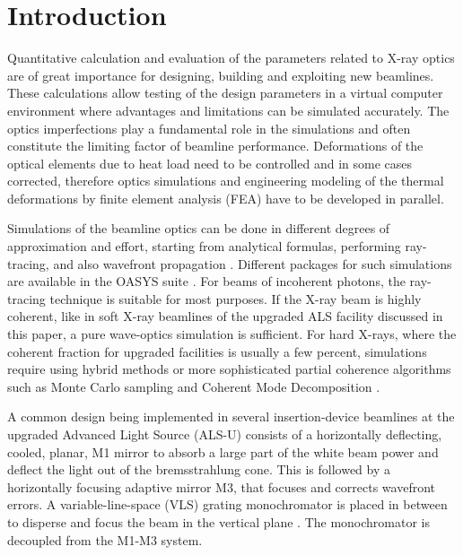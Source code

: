 \documentclass{iucr}
\begin{document}
%
%
%
\section{Introduction}
\label{sec:intro}  

Quantitative calculation and evaluation of the parameters related to X-ray optics are of great importance for designing, building and exploiting new beamlines. These calculations allow testing of the design parameters in a virtual computer environment where advantages and limitations can be simulated accurately. The optics imperfections play a fundamental role in the simulations and often constitute the limiting factor of beamline performance. Deformations of the optical elements due to heat load need to be controlled and in some cases corrected, therefore optics simulations and engineering modeling of the thermal deformations by finite element analysis (FEA) have to be developed in parallel. 

Simulations of the beamline optics can be done in different degrees of approximation and effort, starting from analytical formulas, performing ray-tracing, and also wavefront propagation \cite{hyerarchical}. Different packages for such simulations are available in the OASYS suite \cite{codeOASYS}. For beams of incoherent photons, the ray-tracing technique is suitable for most purposes. If the X-ray beam is highly coherent, like in soft X-ray beamlines of the upgraded ALS facility discussed in this paper, a pure wave-optics simulation is sufficient. For hard X-rays, where the coherent fraction for upgraded facilities is usually a few percent, simulations require using hybrid methods \cite{hybrid} or more sophisticated partial coherence algorithms such as Monte Carlo sampling \cite{Chubar2011b} and Coherent Mode Decomposition \cite{glassEPL}. 

A common design being implemented in several insertion-device beamlines at the upgraded Advanced Light Source (ALS-U) consists of a horizontally deflecting, cooled, planar, M1 mirror to absorb a large part of the white beam power and deflect the light out of the bremsstrahlung cone. This is followed by a horizontally focusing adaptive mirror M3, that focuses and corrects wavefront errors. A variable-line-space (VLS) grating monochromator is placed in between to disperse and focus the beam in the vertical plane \cite{reininger2005}. The monochromator is decoupled from the M1-M3 system. 
\end{document}
